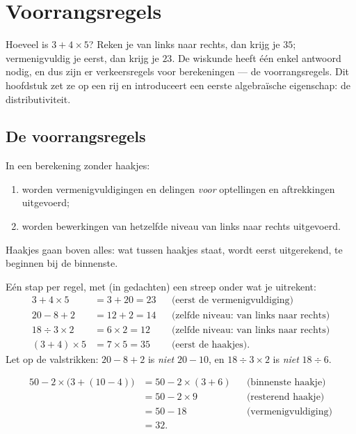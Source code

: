 \chapter{Voorrangsregels}\label{ch:g7:priorities}

Hoeveel is $3 + 4 \times 5$? Reken je van links naar rechts, dan krijg je $35$;
vermenigvuldig je eerst, dan krijg je $23$. De wiskunde heeft één enkel antwoord
nodig, en dus zijn er verkeersregels voor berekeningen --- de voorrangsregels.
Dit hoofdstuk zet ze op een rij en introduceert een eerste algebraïsche
eigenschap: de distributiviteit.

\section{De voorrangsregels}

\begin{theorem}[Voorrangsregels]\label{thm:g7:priorities:rules}
In een berekening zonder haakjes:
\begin{enumerate}
  \item worden vermenigvuldigingen en delingen \emph{voor} optellingen en
        aftrekkingen uitgevoerd;
  \item worden bewerkingen van hetzelfde niveau van links naar rechts
        uitgevoerd.
\end{enumerate}
Haakjes gaan boven alles: wat tussen haakjes staat, wordt eerst uitgerekend, te
beginnen bij de binnenste.
\end{theorem}

\begin{example}\label{ex:g7:priorities:basic}
Eén stap per regel, met (in gedachten) een streep onder wat je uitrekent:
\begin{align*}
3 + 4 \times 5 &= 3 + 20 = 23
&&\text{(eerst de vermenigvuldiging)}\\
20 - 8 + 2 &= 12 + 2 = 14
&&\text{(zelfde niveau: van links naar rechts)}\\
18 \div 3 \times 2 &= 6 \times 2 = 12
&&\text{(zelfde niveau: van links naar rechts)}\\
(3 + 4) \times 5 &= 7 \times 5 = 35
&&\text{(eerst de haakjes).}
\end{align*}
Let op de valstrikken: $20 - 8 + 2$ is \emph{niet} $20 - 10$, en
$18 \div 3 \times 2$ is \emph{niet} $18 \div 6$.
\end{example}

\begin{example}\label{ex:g7:priorities:nested}
\begin{align*}
50 - 2 \times \bigl(3 + (10 - 4)\bigr)
&= 50 - 2 \times (3 + 6) && \text{(binnenste haakje)}\\
&= 50 - 2 \times 9 && \text{(resterend haakje)}\\
&= 50 - 18 && \text{(vermenigvuldiging)}\\
&= 32 .
\end{align*}
\end{example}

